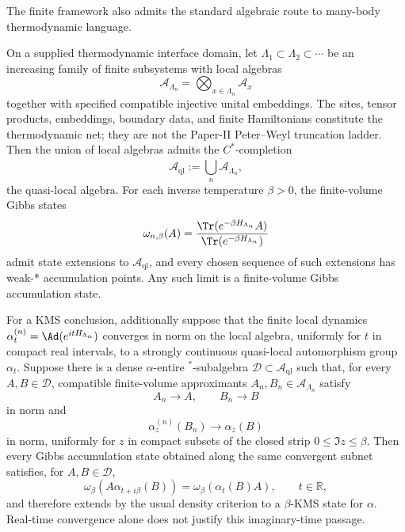 \documentclass[12pt,a4paper]{article}
\begin{document}
The finite framework also admits the standard algebraic route to many-body thermodynamic language.


\begin{theorem}
\label{p4:thm:quasilocal-thermodynamic-bridge}
On a supplied thermodynamic interface domain, let
\(\Lambda_1\subset\Lambda_2\subset\cdots\) be an increasing family of finite
subsystems with local algebras
\[
\mathcal A_{\Lambda_n}=\bigotimes_{x\in\Lambda_n}\mathcal A_x
\]
together with specified compatible injective unital embeddings.  The sites,
tensor products, embeddings, boundary data, and finite Hamiltonians
constitute the thermodynamic net; they are not the Paper-II Peter--Weyl
truncation ladder.  Then the union of local algebras admits the
\(C^*\)-completion
\[
\mathcal A_{\mathrm{ql}}:=\overline{\bigcup_n \mathcal A_{\Lambda_n}},
\]
the quasi-local algebra.
For each inverse temperature \(\beta>0\), the finite-volume Gibbs states
\[
\omega_{n,\beta}(A)=\frac{\Tr(e^{-\beta H_{\Lambda_n}}A)}{\Tr(e^{-\beta H_{\Lambda_n}})}
\]
admit state extensions to \(\mathcal A_{\mathrm{ql}}\), and every chosen
sequence of such extensions has weak-* accumulation points.  Any such
limit is a finite-volume Gibbs accumulation state.

For a KMS conclusion, additionally suppose that the finite local dynamics
\(\alpha_t^{(n)}=\Ad(e^{itH_{\Lambda_n}})\) converges in norm on the local
algebra, uniformly for \(t\) in compact real intervals, to a strongly
continuous quasi-local automorphism group \(\alpha_t\).  Suppose there is a
dense \(\alpha\)-entire \(^*\)-subalgebra
\(\mathcal D\subset\mathcal A_{\mathrm{ql}}\) such that, for every
\(A,B\in\mathcal D\), compatible finite-volume approximants
\(A_n,B_n\in\mathcal A_{\Lambda_n}\) satisfy
\[
A_n\longrightarrow A,\qquad B_n\longrightarrow B
\]
in norm and
\[
\alpha_z^{(n)}(B_n)\longrightarrow\alpha_z(B)
\]
in norm, uniformly for \(z\) in compact subsets of the closed strip
\(0\le\Im z\le\beta\).  Then every Gibbs accumulation state obtained along
the same convergent subnet satisfies, for \(A,B\in\mathcal D\),
\[
\omega_\beta\!\left(A\alpha_{t+i\beta}(B)\right)
=
\omega_\beta\!\left(\alpha_t(B)A\right),
\qquad t\in\mathbb R,
\]
and therefore extends by the usual density criterion to a
\(\beta\)-KMS state for \(\alpha\).  Real-time convergence alone does not
justify this imaginary-time passage.
\end{theorem}
\end{document}
